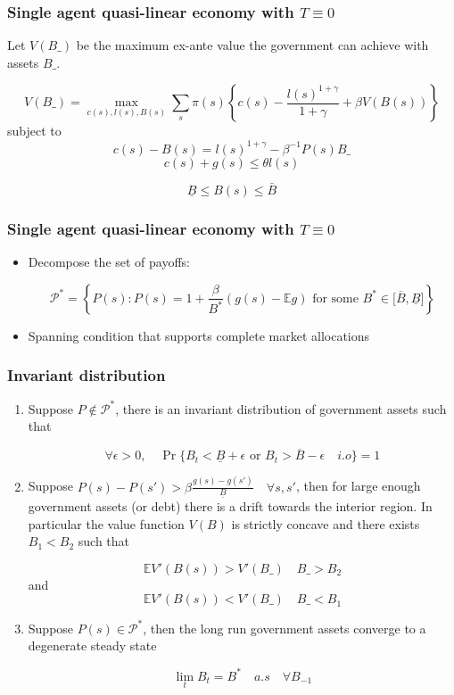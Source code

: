 \documentclass{beamer}
\begin{document}
\begin{frame}%
\frametitle{Single agent quasi-linear economy with $T\equiv 0$}

Let $V(B\_)$ be the maximum ex-ante value the government can achieve with assets $B\_$. 

\[V(B\_)=\max_{c(s),l(s),B(s)} \sum_{s}\pi(s)\left\{c(s)-\frac{l(s)^{1+\gamma}}{1+\gamma}+\beta V(B(s)) \right\}\]
subject to
\[   c(s)-B(s)=l(s)^{1+\gamma}-\beta^{-1} P(s)B\_\]
\[c(s)+g(s)\leq\theta l(s)\]

\[\underline{B}\leq B(s)\leq \bar{B}\]


\end{frame}

\begin{frame}
\frametitle{Single agent quasi-linear economy with $T\equiv 0$}
\begin{itemize}
\item Decompose the set of payoffs:

\[\mathcal{P}^{\ast }=\left\{ P(s):P(s)=1+\frac{\beta }{B^{\ast }}(g(s)-%
\mathbb{E}g)\text{ for some }B^{\ast }\in \lbrack \overline{B},\underline{B}%
]\right\} \]

\item Spanning condition that supports complete market allocations

\end{itemize}



\end{frame}


\begin{frame}

\frametitle{Invariant distribution}
\begin{theorem}
\begin{enumerate}
\small

 \item Suppose $P\not \in \mathcal{P}^*$, there is an invariant distribution of government assets such that 

\[\forall \epsilon>0, \quad \Pr\{B_t<\underline{B}+\epsilon \text{ or } B_t>\overline{B}-\epsilon \quad i.o \}=1\]

\item Suppose  $P(s)-P(s')>\beta \frac{g(s)-g(s')}{\underline{B}} \quad \forall s,s'$, then for large enough government assets (or debt) there is a drift towards the interior region.  In particular the value function $V(B)$ is strictly concave and there exists $B_1<B_2$ such that

\[\mathbb{E}V'(B(s))>V'(B\_) \quad B\_>B_2 \]
and
\[\mathbb{E}V'(B(s))<V'(B\_) \quad B\_<B_1 \]

\item Suppose $P(s)\in \mathcal{P}^*$, then the  long run government assets converge to a degenerate steady state

\[\lim_tB_t=  B^*\quad a.s \quad \forall B_{-1} \]


\end{enumerate}


\end{theorem}


\end{frame}%
\end{document}
